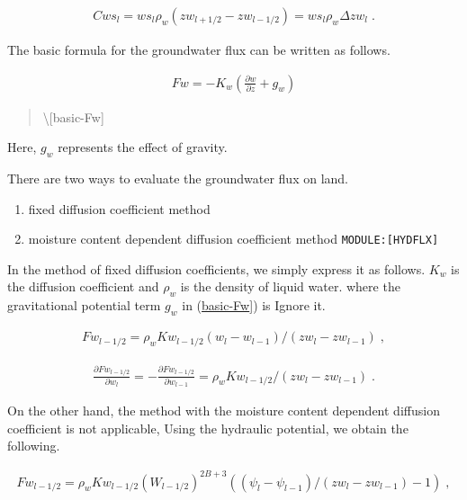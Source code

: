 \begin{eqnarray}
  Cws_{l}  = ws_{l} \rho_w (zw_{l+1/2} - zw_{l-1/2})
           = ws_{l} \rho_w \Delta zw_{l} \; .
\end{eqnarray}

The basic formula for the groundwater flux can be written as follows.

\begin{eqnarray}
  F{w} = - K_{w} \left( \frac{\partial w}{\partial z} + g_w \right)
\end{eqnarray}

\begin{quote}
\protect\hypertarget{basic-Fw}{}{\textbackslash{[}basic-Fw{]}}
\end{quote}

Here, \(g_w\) represents the effect of gravity.

There are two ways to evaluate the groundwater flux on land.

\begin{enumerate}
\def\labelenumi{\arabic{enumi}.}
\item
  fixed diffusion coefficient method
\item
  moisture content dependent diffusion coefficient method
  \texttt{MODULE:{[}HYDFLX{]}}
\end{enumerate}

In the method of fixed diffusion coefficients, we simply express it as
follows. \(K_w\) is the diffusion coefficient and \(\rho_w\) is the
density of liquid water. where the gravitational potential term \(g_w\)
in (\protect\hyperlink{basic-Fw}{basic-Fw{]}}) is Ignore it.

\begin{eqnarray}
  Fw_{l-1/2} = \rho_w Kw_{l-1/2} (w_l - w_{l-1})/(zw_l - zw_{l-1}) \; ,
\end{eqnarray}

\begin{eqnarray}
  \frac{\partial Fw_{l-1/2}}{\partial w_l} = - \frac{\partial Fw_{l-1/2}}{\partial w_{l-1}}
 = \rho_w Kw_{l-1/2}/(zw_l - zw_{l-1}) \; .
\end{eqnarray}

On the other hand, the method with the moisture content dependent
diffusion coefficient is not applicable, Using the hydraulic potential,
we obtain the following.

\begin{eqnarray}
  Fw_{l-1/2} = \rho_w Kw_{l-1/2} (W_{l-1/2})^{2B+3} 
             ( (\psi_{l} - \psi_{l-1})/(zw_{l} - zw_{l-1}) -1 ) \; ,
\end{eqnarray}


